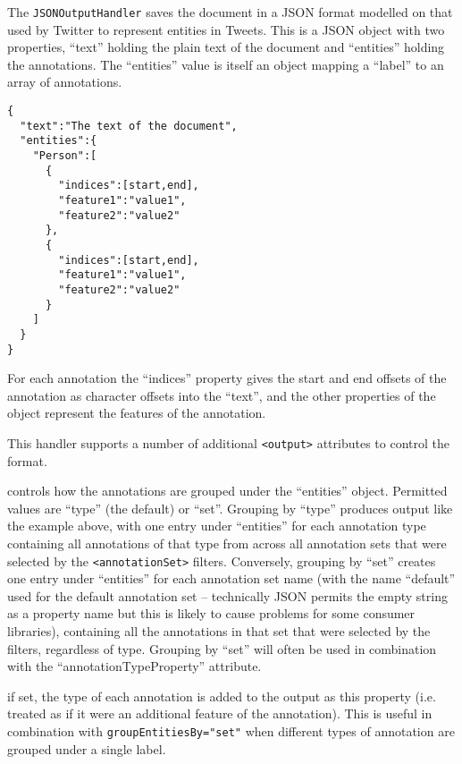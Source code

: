 The \verb!JSONOutputHandler! saves the document in a JSON format modelled on
that used by Twitter to represent entities in Tweets.  This is a JSON object
with two properties, ``text'' holding the plain text of the document and
``entities'' holding the annotations.  The ``entities'' value is itself an
object mapping a ``label'' to an array of annotations.
%
\begin{verbatim}
{
  "text":"The text of the document",
  "entities":{
    "Person":[
      {
        "indices":[start,end],
        "feature1":"value1",
        "feature2":"value2"
      },
      {
        "indices":[start,end],
        "feature1":"value1",
        "feature2":"value2"
      }
    ]
  }
}
\end{verbatim}

For each annotation the ``indices'' property gives the start and end offsets of
the annotation as character offsets into the ``text'', and the other properties
of the object represent the features of the annotation.

This handler supports a number of additional \verb!<output>! attributes to
control the format.

\bde
\item[groupEntitiesBy] controls how the annotations are grouped under the
  ``entities'' object.  Permitted values are ``type'' (the default) or ``set''.
  Grouping by ``type'' produces output like the example above, with one entry
  under ``entities'' for each annotation type containing all annotations of
  that type from across all annotation sets that were selected by the
  \verb!<annotationSet>! filters.  Conversely, grouping by ``set'' creates one
  entry under ``entities'' for each annotation set name (with the name
  ``default'' used for the default annotation set -- technically JSON
  permits the empty string as a property name but this is likely to cause
  problems for some consumer libraries), containing all the annotations in
  that set that were selected by the filters, regardless of type.  Grouping by
  ``set'' will often be used in combination with the ``annotationTypeProperty''
  attribute.

\item[annotationTypeProperty] if set, the type of each annotation is added to
  the output as this property (i.e. treated as if it were an additional feature
  of the annotation).  This is useful in combination with
  \verb!groupEntitiesBy="set"! when different types of annotation are grouped
  under a single label.

